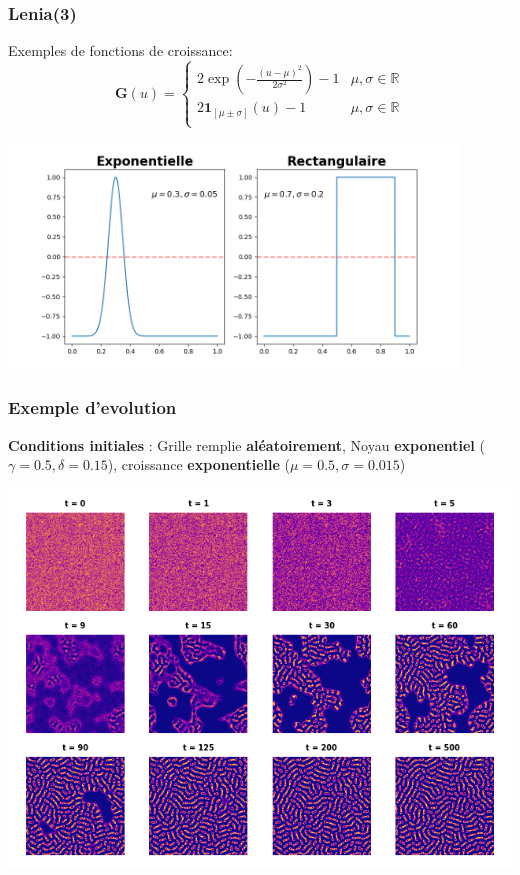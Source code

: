 \documentclass[aspectratio=43]{beamer}
\begin{document}
\begin{frame}
	\frametitle{Lenia(3)}
	Exemples de fonctions de croissance:
	\[
		\mathbf{G}(u) = 
		\begin{cases}	
			2\exp\left(-\displaystyle\frac{(u - \mu)^2}{2\sigma^2}\right) - 1 & \mu, \sigma \in \mathbb{R} \\
			2\mathbf{1}_{[\mu \pm \sigma]}(u) - 1 & \mu, \sigma \in \mathbb{R} \\
		\end{cases}
	\]
	\begin{center}
		\includegraphics[width=0.9\textwidth]{plot_growth_mapping.png}
	\end{center}
\end{frame}

\begin{frame}
	\frametitle{Exemple d'evolution}

	\centering

	\textbf{Conditions initiales} : Grille remplie \textbf{al\'eatoirement}, Noyau \textbf{exponentiel} ($\gamma = 0.5, \delta = 0.15$), croissance \textbf{exponentielle} ($\mu = 0.5, \sigma = 0.015$)

	\includegraphics[height=.75\textheight]{evolution_lenia_random_init.png}

\end{frame}
\end{document}
